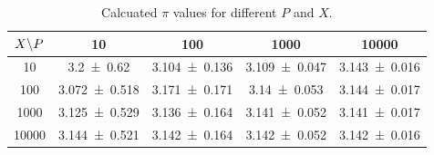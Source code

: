 \begin{table}
\centering
\caption{
    Calcuated $\pi$ values for different $P$ and $X$.
    }
\label{tab:ex1.5_pi_values}
\begin{tabular}{c|cccc}
\toprule
$X \text\textbackslash P$ & 10 & 100 & 1000 & 10000 \\
\midrule
10 & \num{3.2 \pm 0.62} & \num{3.104 \pm 0.136} & \num{3.109 \pm 0.047} & \num{3.143 \pm 0.016} \\
100 & \num{3.072 \pm 0.518} & \num{3.171 \pm 0.171} & \num{3.14 \pm 0.053} & \num{3.144 \pm 0.017} \\
1000 & \num{3.125 \pm 0.529} & \num{3.136 \pm 0.164} & \num{3.141 \pm 0.052} & \num{3.141 \pm 0.017} \\
10000 & \num{3.144 \pm 0.521} & \num{3.142 \pm 0.164} & \num{3.142 \pm 0.052} & \num{3.142 \pm 0.016} \\
\bottomrule
\end{tabular}
\end{table}
